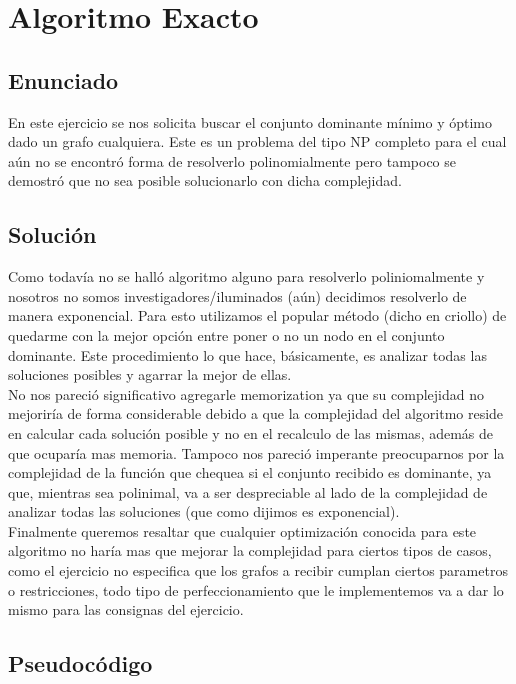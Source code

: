 \section{Algoritmo Exacto}

\subsection{Enunciado}
En este ejercicio se nos solicita buscar el conjunto dominante mínimo y óptimo dado un grafo cualquiera. Este es un problema del tipo NP completo 
para el cual aún no se encontró forma de resolverlo polinomialmente pero tampoco se demostró que no sea posible solucionarlo con dicha complejidad.

\subsection{Soluci\'on}
Como todavía no se halló algoritmo alguno para resolverlo poliniomalmente y nosotros no somos investigadores/iluminados (aún) decidimos resolverlo
de manera exponencial. Para esto utilizamos el popular método (dicho en criollo) de quedarme con la mejor opción entre poner o no un nodo en el 
conjunto dominante. Este procedimiento lo que hace, básicamente, es analizar todas las soluciones posibles y agarrar la mejor de ellas. \\
No nos pareció significativo agregarle memorization ya que su complejidad no mejoriría de forma considerable debido a que la complejidad del algoritmo reside en calcular cada solución posible y no en el recalculo de las mismas, además de que ocuparía mas memoria. Tampoco nos pareció imperante preocuparnos por la complejidad de la función que chequea si el conjunto recibido es dominante, ya que, mientras sea polinimal, va a ser despreciable al lado de la complejidad de analizar todas las soluciones (que como dijimos es exponencial). \\
Finalmente queremos resaltar que cualquier optimización conocida para este algoritmo no haría mas que mejorar la complejidad para ciertos tipos de casos, como el ejercicio no especifica que los grafos a recibir cumplan ciertos parametros o restricciones, todo tipo de perfeccionamiento que le implementemos va a dar lo mismo para las consignas del ejercicio.

\subsection{Pseudocódigo}

